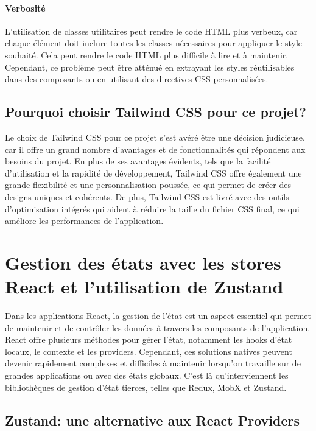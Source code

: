 \paragraph{Verbosité}

L'utilisation de classes utilitaires peut rendre le code HTML plus verbeux, car chaque élément doit inclure toutes les classes nécessaires pour appliquer le style souhaité. Cela peut rendre le code HTML plus difficile à lire et à maintenir. Cependant, ce problème peut être atténué en extrayant les styles réutilisables dans des composants ou en utilisant des directives CSS personnalisées.

\subsection{Pourquoi choisir Tailwind CSS pour ce projet?}

Le choix de Tailwind CSS pour ce projet s'est avéré être une décision judicieuse, car il offre un grand nombre d'avantages et de fonctionnalités qui répondent aux besoins du projet. En plus de ses avantages évidents, tels que la facilité d'utilisation et la rapidité de développement, Tailwind CSS offre également une grande flexibilité et une personnalisation poussée, ce qui permet de créer des designs uniques et cohérents. De plus, Tailwind CSS est livré avec des outils d'optimisation intégrés qui aident à réduire la taille du fichier CSS final, ce qui améliore les performances de l'application.

\section{Gestion des états avec les stores React et l'utilisation de Zustand}

Dans les applications React, la gestion de l'état est un aspect essentiel qui permet de maintenir et de contrôler les données à travers les composants de l'application. React offre plusieurs méthodes pour gérer l'état, notamment les hooks d'état locaux, le contexte et les providers. Cependant, ces solutions natives peuvent devenir rapidement complexes et difficiles à maintenir lorsqu'on travaille sur de grandes applications ou avec des états globaux. C'est là qu'interviennent les bibliothèques de gestion d'état tierces, telles que Redux, MobX et Zustand.

\subsection{Zustand: une alternative aux React Providers}

